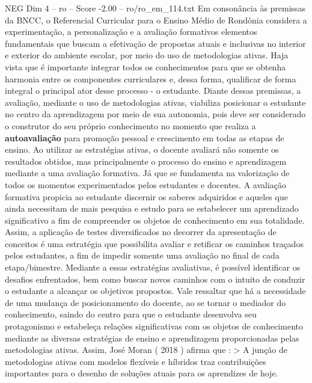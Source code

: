\begin{textsample}{NEG Dim 4 – ro – Score -2.00 – ro/ro\_em\_114.txt}
Em consonância às premissas da BNCC, o Referencial Curricular para o Ensino Médio de Rondônia considera a experimentação, a personalização e a avaliação formativos elementos fundamentais que buscam a efetivação de propostas atuais e inclusivas no interior e exterior do ambiente escolar, por meio do uso de metodologias ativas.
Haja vista que é importante integrar todos os conhecimentos para que se obtenha harmonia entre os componentes curriculares e, dessa forma, qualificar de forma integral o principal ator desse processo - o estudante.
Diante dessas premissas, a avaliação, mediante o uso de metodologias ativas, viabiliza posicionar o estudante no centro da aprendizagem por meio de sua autonomia, pois deve ser considerado o construtor do seu próprio conhecimento no momento que realiza a \textbf{autoavaliação} para promoção pessoal e crescimento em todas as etapas de ensino.
Ao utilizar as estratégias ativas, o docente avaliará não somente os resultados obtidos, mas principalmente o processo do ensino e aprendizagem mediante a uma avaliação formativa.
Já que se fundamenta na valorização de todos os momentos experimentados pelos estudantes e docentes.
A avaliação formativa propicia ao estudante discernir os saberes adquiridos e aqueles que ainda necessitam de mais pesquisa e estudo para se estabelecer um aprendizado significativo a fim de compreender os objetos de conhecimento em sua totalidade.
Assim, a aplicação de testes diversificados no decorrer da apresentação de conceitos é uma estratégia que possibilita avaliar e retificar os caminhos traçados pelos estudantes, a fim de impedir somente uma avaliação no final de cada etapa/bimestre.
Mediante a essas estratégias avaliativas, é possível identificar os desafios enfrentados, bem como buscar novos caminhos com o intuito de conduzir o estudante a alcançar os objetivos propostos.
Vale ressaltar que há a necessidade de uma mudança de posicionamento do docente, ao se tornar o mediador do conhecimento, saindo do centro para que o estudante desenvolva seu protagonismo e estabeleça relações significativas com os objetos de conhecimento mediante as diversas estratégias de ensino e aprendizagem proporcionadas pelas metodologias ativas.
Assim, José Moran ( 2018 ) afirma que : > A junção de metodologias ativas com modelos flexíveis e híbridos traz contribuições importantes para o desenho de soluções atuais para os aprendizes de hoje.

\end{textsample}
